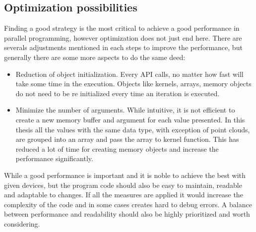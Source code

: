 \subsection{Optimization possibilities}
Finding a good strategy is the most critical to achieve a good performance in parallel programming, however optimization does not just end here. There are severals adjustments mentioned in each steps to improve the performance, but generally there are some more aspects to do the same deed:
\begin{itemize}
\item Reduction of object initialization. Every API calls, no matter how fast will take some time in the execution. Objects like kernels, arrays, memory objects do not need to be re initialized every time an iteration is executed.
\item Minimize the number of arguments. While intuitive, it is not efficient to create a new memory buffer and argument  for each value presented. In this thesis all the values with the same data type, with exception of point clouds, are grouped into an array and pass the array to kernel function. This has reduced a lot of time  for creating memory objects and increase the performance significantly.
\end{itemize}
While a good performance is important and it is noble to achieve the best with given devices, but the program code should also be easy to maintain, readable and adaptable to changes. If all the measures are applied it would increase the complexity of the code and in some cases creates hard to debug errors. A balance between performance and readability should also be highly prioritized and worth considering.
